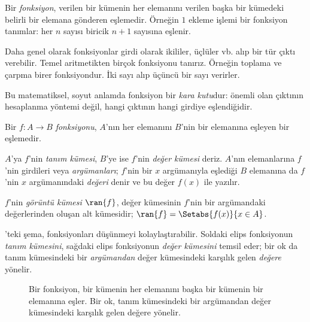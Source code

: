 


\begin{explain}
Bir \emph{fonksiyon}, verilen bir kümenin her elemanını verilen başka bir
kümedeki belirli bir elemana gönderen eşlemedir. Örneğin $1$ ekleme işlemi bir
fonksiyon tanımlar: her $n$ sayısı biricik $n+1$ sayısına eşlenir.

Daha genel olarak fonksiyonlar girdi olarak ikililer, üçlüler vb. alıp bir tür
çıktı verebilir. Temel aritmetikten birçok fonksiyonu tanırız. Örneğin toplama
ve çarpma birer fonksiyondur. İki sayı alıp üçüncü bir sayı verirler.

Bu matematiksel, soyut anlamda fonksiyon bir \emph{kara kutu}dur: önemli olan
çıktının hesaplanma yöntemi değil, hangi çıktının hangi girdiye eşlendiğidir.
\end{explain}

\begin{defn}[Fonksiyon]
Bir $f \colon A \to B$ \emph{fonksiyonu}, $A$'nın her elemanını $B$'nin bir
elemanına eşleyen bir eşlemedir.

$A$'ya $f$'nin \emph{tanım kümesi}, $B$'ye ise $f$'nin \emph{değer kümesi}
deriz. $A$'nın elemanlarına $f$'nin girdileri veya \emph{argümanları};
$f$'nin bir $x$ argümanıyla eşlediği $B$ elemanına da $f$'nin $x$
argümanındaki \emph{değeri} denir ve bu değer $f(x)$ ile yazılır.

$f$'nin \emph{görüntü kümesi} $\ran{f}$, değer kümesinin $f$'nin bir
argümandaki değerlerinden oluşan alt kümesidir; $\ran{f} =
\Setabs{f(x)}{x \in A}$.
\end{defn}

'teki şema, fonksiyonları düşünmeyi kolaylaştırabilir.
Soldaki elips fonksiyonun \emph{tanım kümesini}, sağdaki elips fonksiyonun
\emph{değer kümesini} temsil eder; bir ok da tanım kümesindeki bir
\emph{argümandan} değer kümesindeki karşılık gelen \emph{değere} yönelir.

\begin{figure}
  \caption{Bir fonksiyon, bir kümenin her elemanını başka bir kümenin bir
    elemanına eşler. Bir ok, tanım kümesindeki bir argümandan değer
    kümesindeki karşılık gelen değere yönelir.}
\end{figure}

